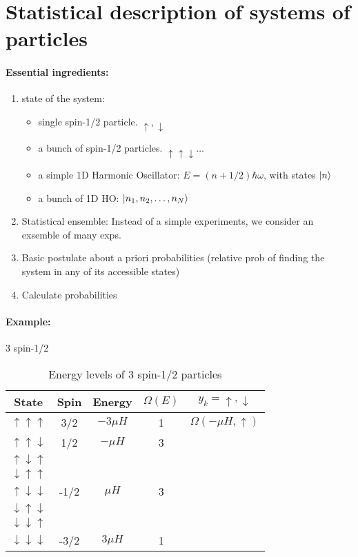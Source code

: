 \documentclass[../main.tex]{subfiles}
\begin{document}
\pagestyle{fancy}

\section{Statistical description of systems of particles}
\barh \vspace*{1em}

\paragraph*{Essential ingredients:}
\begin{enumerate}
    \item state of the system:
    \begin{itemize}
        \item single spin-1/2 particle. $\uparrow, \downarrow$
        \item a bunch of spin-1/2 particles. $\uparrow\uparrow\downarrow\dots$
        \item a simple 1D Harmonic Oscillator: $E = (n + 1/2) \hbar \omega$, with states $\ket{n}$
        \item a bunch of 1D HO: $\ket{n_1, n_2, \dots, n_N}$
    \end{itemize}
    \item Statistical ensemble: Instead of a simple experiments, we consider an exsemble of many exps.
    \item Basic postulate about a priori probabilities (relative prob of finding the system in any of its accessible states)
    \item Calculate probabilities
\end{enumerate}

\paragraph*{Example:} 3 spin-1/2
\begin{table} [ht]
    \centering
    \begin{tabular}{c|c|c|c|c}
        State & Spin & Energy & $\Omega(E)$ & $y_k = \uparrow, \downarrow$ \\
        \hline
        $\uparrow\uparrow\uparrow$ & 3/2 & $-3\mu H$ & 1 & $\Omega(-\mu H, \uparrow)$ \\
        $\uparrow\uparrow\downarrow$ & 1/2 & $-\mu H$ & 3 \\
        $\uparrow\downarrow\uparrow$ & & & \\
        $\downarrow\uparrow\uparrow$ & & & \\
        $\uparrow\downarrow\downarrow$ & -1/2 & $\mu H$ & 3 \\
        $\downarrow\uparrow\downarrow$ & & & \\
        $\downarrow\downarrow\uparrow$ & & & \\
        $\downarrow\downarrow\downarrow$ & -3/2 & $3\mu H$ & 1
    \end{tabular}
    \caption{Energy levels of 3 spin-1/2 particles}
    \label{tab:3spin}
\end{table}
\end{document}
